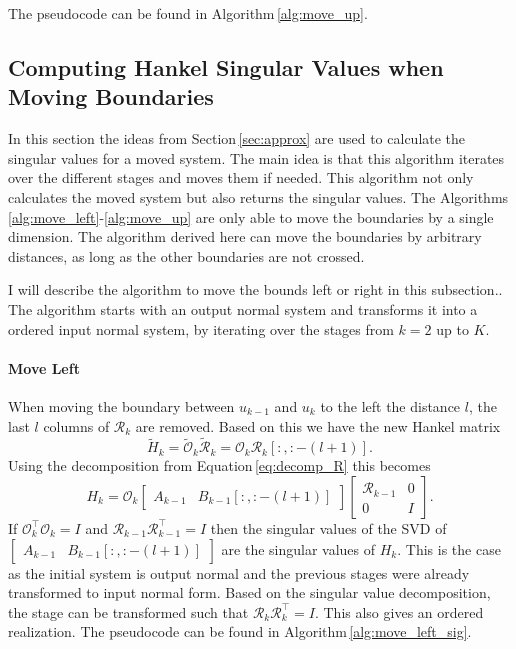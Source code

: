 \documentclass[doctype=mastersthesis,BCOR=15mm,biblatex]{ldvbook}%
\newcommand{\R}{\mathcal{R}} %
\newcommand{\Ob}{\mathcal{O}} %
\newcommand{\eye}{I} %
\begin{document}
The pseudocode can be found in Algorithm\,\ref{alg:move_up}.

\FloatBarrier
\subsection{Computing Hankel Singular Values when Moving Boundaries}\label{subsec:move_sig}
In this section the ideas from Section\,\ref{sec:approx} are used to calculate the singular values for a moved system.
The main idea is that this algorithm iterates over the different stages and moves them if needed.
This algorithm not only calculates the moved system but also returns the singular values.
The Algorithms\,\ref{alg:move_left}-\ref{alg:move_up} are only able to move the boundaries by a single dimension.
The algorithm derived here can move the boundaries by arbitrary distances, as long as the other boundaries are not crossed. 


I will describe the algorithm to move the bounds left or right in this subsection.. 
The algorithm starts with an output normal system and transforms it into a ordered input normal system, by iterating over the stages from $k=2$ up to $K$.


\paragraph{Move Left}
When moving the boundary between $u_{k-1}$ and $u_{k}$ to the left the distance $l$, the last $l$ columns of $\R_{k}$ are removed.
Based on this we have the new Hankel matrix
\begin{equation}
	\tilde{H}_k = \tilde{\Ob}_k \tilde{\R}_k = \Ob_{k}\R_{k}[:,:-(l+1)]
	.
\end{equation}
Using the decomposition from Equation\,\ref{eq:decomp_R} this becomes
\begin{equation}
	H_{k}=\Ob_{k}
	\begin{bmatrix}
	A_{k-1}&B_{k-1}[:,:-(l+1)]
	\end{bmatrix}
	\begin{bmatrix}
	\R_{k-1} & 0\\ 0& \eye
	\end{bmatrix}
	.
\end{equation}
If $\Ob_k^\top \Ob_k = \eye$ and $\R_{k-1} \R_{k-1}^\top = \eye$ then the singular values of the SVD of $\begin{bmatrix}
A_{k-1}&B_{k-1}[:,:-(l+1)]
\end{bmatrix}$ are the singular values of $H_k$.
This is the case as the initial system is output normal and the previous stages were already transformed to input normal form.
Based on the singular value decomposition, the stage can be transformed such that $\R_{k} \R_{k}^\top = \eye$.
This also gives an ordered realization.
The pseudocode can be found in Algorithm\,\ref{alg:move_left_sig}.
\end{document}
